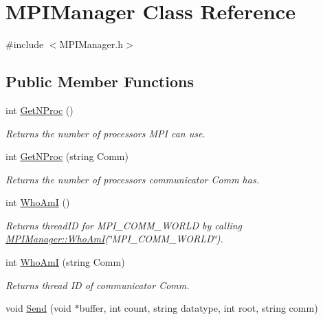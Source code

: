\hypertarget{classJKBuilder_1_1MPIManager}{
\section{MPIManager Class Reference}
\label{classJKBuilder_1_1MPIManager}
}


{\ttfamily \#include $<$MPIManager.h$>$}\subsection*{Public Member Functions}
\begin{DoxyCompactItemize}
\item 
int \hyperlink{classJKBuilder_1_1MPIManager_af29235075c80eddd344e686522304ae3}{GetNProc} ()
\begin{DoxyCompactList}\small\item\em Returns the number of processors MPI can use. \item\end{DoxyCompactList}\item 
int \hyperlink{classJKBuilder_1_1MPIManager_ad7e8bcb21ab0390b8330848222de5dcd}{GetNProc} (string Comm)
\begin{DoxyCompactList}\small\item\em Returns the number of processors communicator Comm has. \item\end{DoxyCompactList}\item 
int \hyperlink{classJKBuilder_1_1MPIManager_a8381bb709c5cc6aec8837bacd875db19}{WhoAmI} ()
\begin{DoxyCompactList}\small\item\em Returns threadID for MPI\_\-COMM\_\-WORLD by calling \hyperlink{classJKBuilder_1_1MPIManager_a8381bb709c5cc6aec8837bacd875db19}{MPIManager::WhoAmI}(\char`\"{}MPI\_\-COMM\_\-WORLD\char`\"{}). \item\end{DoxyCompactList}\item 
int \hyperlink{classJKBuilder_1_1MPIManager_ae78ccb19a8d31a623839b5a25ccd95ba}{WhoAmI} (string Comm)
\begin{DoxyCompactList}\small\item\em Returns thread ID of communicator Comm. \item\end{DoxyCompactList}\item 
void \hyperlink{classJKBuilder_1_1MPIManager_accd63186e1017516c2c303c5683a370d}{Send} (void $\ast$buffer, int count, string datatype, int root, string comm)

\end{DoxyCompactItemize}
